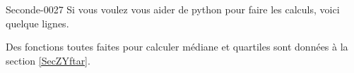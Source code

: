 \begin{corrige}{Seconde-0027}
    Si vous voulez vous aider de python pour faire les calculs, voici quelque lignes.

    

    Des fonctions toutes faites pour calculer médiane et quartiles sont données à la section \ref{SecZYftar}.

\end{corrige}
